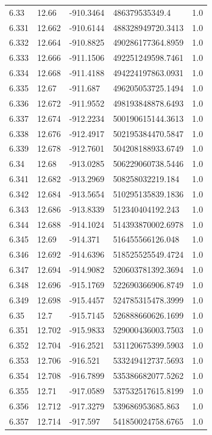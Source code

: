 \begin{tabular}{lllll}
6.33 & 12.66 & -910.3464 & 486379535349.4 & 1.0 \\
6.331 & 12.662 & -910.6144 & 488328949720.3413 & 1.0 \\
6.332 & 12.664 & -910.8825 & 490286177364.8959 & 1.0 \\
6.333 & 12.666 & -911.1506 & 492251249598.7461 & 1.0 \\
6.334 & 12.668 & -911.4188 & 494224197863.0931 & 1.0 \\
6.335 & 12.67 & -911.687 & 496205053725.1494 & 1.0 \\
6.336 & 12.672 & -911.9552 & 498193848878.6493 & 1.0 \\
6.337 & 12.674 & -912.2234 & 500190615144.3613 & 1.0 \\
6.338 & 12.676 & -912.4917 & 502195384470.5847 & 1.0 \\
6.339 & 12.678 & -912.7601 & 504208188933.6749 & 1.0 \\
6.34 & 12.68 & -913.0285 & 506229060738.5446 & 1.0 \\
6.341 & 12.682 & -913.2969 & 508258032219.184 & 1.0 \\
6.342 & 12.684 & -913.5654 & 510295135839.1836 & 1.0 \\
6.343 & 12.686 & -913.8339 & 512340404192.243 & 1.0 \\
6.344 & 12.688 & -914.1024 & 514393870002.6978 & 1.0 \\
6.345 & 12.69 & -914.371 & 516455566126.048 & 1.0 \\
6.346 & 12.692 & -914.6396 & 518525525549.4724 & 1.0 \\
6.347 & 12.694 & -914.9082 & 520603781392.3694 & 1.0 \\
6.348 & 12.696 & -915.1769 & 522690366906.8749 & 1.0 \\
6.349 & 12.698 & -915.4457 & 524785315478.3999 & 1.0 \\
6.35 & 12.7 & -915.7145 & 526888660626.1699 & 1.0 \\
6.351 & 12.702 & -915.9833 & 529000436003.7503 & 1.0 \\
6.352 & 12.704 & -916.2521 & 531120675399.5903 & 1.0 \\
6.353 & 12.706 & -916.521 & 533249412737.5693 & 1.0 \\
6.354 & 12.708 & -916.7899 & 535386682077.5262 & 1.0 \\
6.355 & 12.71 & -917.0589 & 537532517615.8199 & 1.0 \\
6.356 & 12.712 & -917.3279 & 539686953685.863 & 1.0 \\
6.357 & 12.714 & -917.597 & 541850024758.6765 & 1.0 \\

\end{tabular}
